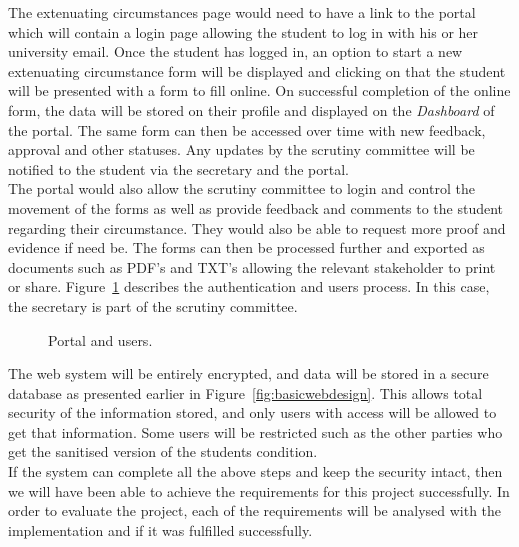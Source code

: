 \documentclass[../main.tex]{subfiles}
\begin{document}
\raggedright

The extenuating circumstances page\cite{ecfuni} would need to have a link to the portal which will contain a login page allowing the student to log in with his or her university email. Once the student has logged in, an option to start a new extenuating circumstance form will be displayed and clicking on that the student will be presented with a form to fill online. On successful completion of the online form, the data will be stored on their profile and displayed on the \textit{Dashboard} of the portal. The same form can then be accessed over time with new feedback, approval and other statuses. Any updates by the scrutiny committee will be notified to the student via the secretary and the portal. \\[4mm]

The portal would also allow the scrutiny committee to login and control the movement of the forms as well as provide feedback and comments to the student regarding their circumstance. They would also be able to request more proof and evidence if need be. The forms can then be processed further and exported as documents such as PDF's and TXT's allowing the relevant stakeholder to print or share. Figure~\ref{fig:portal1} describes the authentication and users process. In this case, the secretary is part of the scrutiny committee. 

	\begin{figure}[H]
        \caption{\label{fig:portal1} Portal and users.}
      \end{figure}

The web system will be entirely encrypted, and data will be stored in a secure database as presented earlier in Figure~\ref{fig:basicwebdesign}. This allows total security of the information stored, and only users with access will be allowed to get that information. Some users will be restricted such as the other parties who get the sanitised version of the students condition. \\[4mm]

If the system can complete all the above steps and keep the security intact, then we will have been able to achieve the requirements for this project successfully. In order to evaluate the project, each of the requirements will be analysed with the implementation and if it was fulfilled successfully. 
\end{document}
